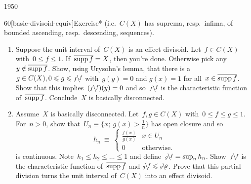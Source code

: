 \begin{parsec}{1950}
\begin{point}{60}[basic-divisoid-equiv]{Exercise*}
    (i.e.~$C(X)$ has suprema, resp.~infima, of
            bounded ascending, resp.~descending, sequences).
\begin{enumerate}
\item
    Suppose the unit interval of~$C(X)$ is an effect divisoid.
        Let~$f \in C(X)$ with~$0 \leq f \leq 1$.
    If~$\overline{\operatorname{supp} f} = X$, then you're done.
        Otherwise pick any~$y \notin \overline{\operatorname{supp} f}$.
    Show, using Urysohn's lemma,
    that there is a~$g \in C(X), 0\leq g \leq \rfrac{f}{f}$
    with~$g(y) = 0$ and $g(x) = 1$ for all~$x \in \overline{\operatorname{supp} f}$.
    Show that this implies~$(\rfrac{f}{f})(y) = 0$
        and so~$\rfrac{f}{f}$ is the characteristic function
    of~$\overline{\operatorname{supp} f}$.  Conclude~$X$ is basically disconnected.
\item
Assume~$X$ is basically disconnected.
Let~$f,g\in C(X)$ with~$0 \leq f \leq g \leq 1$.
For~$n > 0$,
show that~$U_n \equiv \{ x;\ g(x) > \frac{1}{n} \}$
has open closure and so
\begin{equation*}
    h_n \ \equiv \  \begin{cases}
        \frac{f(x)}{g(x)} & x \in \overline{U_n}\\
        0 & \text{otherwise}.
    \end{cases}
\end{equation*}
is continuous.
Note~$h_1 \leq h_2 \leq \ldots \leq 1$
    and define~$\rfrac{f}{g} = \sup_n h_n$.
Show~$\rfrac{f}{f}$ is the characteristic function
    of~$\overline{\operatorname{supp} f}$ and
    $\rfrac{f}{g} \leq \rfrac{g}{g}$.
Prove that this partial division turns the unit interval of~$C(X)$
    into an effect divisoid.
\end{enumerate}
\spacingfix{}


\end{point}
\end{parsec}

